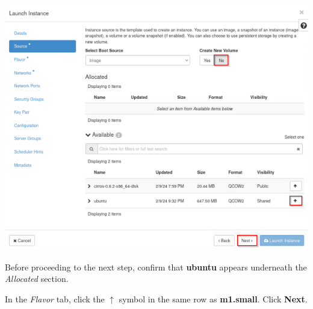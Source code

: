 \documentclass[letterpaper, 12pt]{article}
\begin{document}
\begin{enumerate}
\begin{labstep}
        \begin{center}
            \includegraphics[width=\linewidth]{images/part1/step6.png}
        \end{center}
    \end{labstep}

    \begin{stopbox}
        Before proceeding to the next step, confirm that \textbf{ubuntu} appears underneath the \textit{Allocated} section.
    \end{stopbox}

    \begin{labstep}
        In the \textit{Flavor} tab, click the $\uparrow$ symbol in the same row as \textbf{m1.small}.
        Click \textbf{Next}.


\end{labstep}
\end{enumerate}
\end{document}
